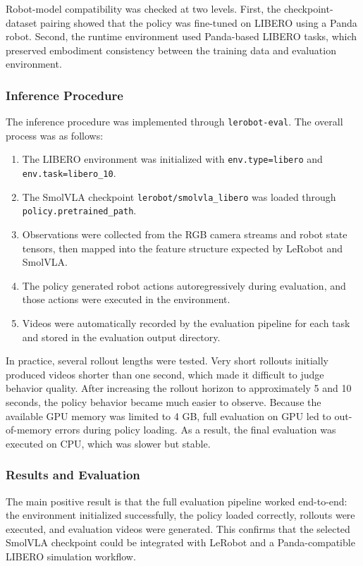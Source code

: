 \documentclass[11pt,a4paper]{article}
\begin{document}
Robot-model compatibility was checked at two levels. First, the checkpoint-dataset pairing showed that the policy was fine-tuned on LIBERO using a Panda robot. Second, the runtime environment used Panda-based LIBERO tasks, which preserved embodiment consistency between the training data and evaluation environment.

\subsubsection{Inference Procedure}
The inference procedure was implemented through \texttt{lerobot-eval}. The overall process was as follows:

\begin{enumerate}[leftmargin=1.5em]
	\item The LIBERO environment was initialized with \texttt{env.type=libero} and \texttt{env.task=libero\_10}.
	\item The SmolVLA checkpoint \texttt{lerobot/smolvla\_libero} was loaded through \texttt{policy.pretrained\_path}.
	\item Observations were collected from the RGB camera streams and robot state tensors, then mapped into the feature structure expected by LeRobot and SmolVLA.
	\item The policy generated robot actions autoregressively during evaluation, and those actions were executed in the environment.
	\item Videos were automatically recorded by the evaluation pipeline for each task and stored in the evaluation output directory.
\end{enumerate}

In practice, several rollout lengths were tested. Very short rollouts initially produced videos shorter than one second, which made it difficult to judge behavior quality. After increasing the rollout horizon to approximately 5 and 10 seconds, the policy behavior became much easier to observe. Because the available GPU memory was limited to 4 GB, full evaluation on GPU led to out-of-memory errors during policy loading. As a result, the final evaluation was executed on CPU, which was slower but stable.

\subsubsection{Results and Evaluation}
The main positive result is that the full evaluation pipeline worked end-to-end: the environment initialized successfully, the policy loaded correctly, rollouts were executed, and evaluation videos were generated. This confirms that the selected SmolVLA checkpoint could be integrated with LeRobot and a Panda-compatible LIBERO simulation workflow.
\end{document}
